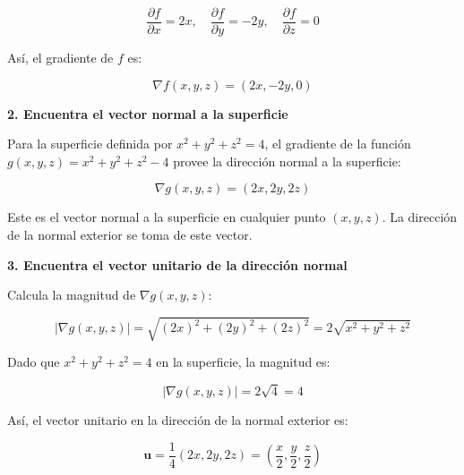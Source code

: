 \documentclass{report}
\begin{document}
                        \[
                        \frac{\partial f}{\partial x} = 2x, \quad \frac{\partial f}{\partial y} = -2y, \quad \frac{\partial f}{\partial z} = 0
                        \]
                        
                        Así, el gradiente de \( f \) es:
                        
                        \[
                        \nabla f(x, y, z) = (2x, -2y, 0)
                        \]
                        
                        \textbf{2. Encuentra el vector normal a la superficie}
                        
                        Para la superficie definida por \( x^2 + y^2 + z^2 = 4 \), el gradiente de la función \( g(x, y, z) = x^2 + y^2 + z^2 - 4 \) provee la dirección normal a la superficie:
                        
                        \[
                        \nabla g(x, y, z) = (2x, 2y, 2z)
                        \]
                        
                        Este es el vector normal a la superficie en cualquier punto \((x, y, z)\). La dirección de la normal exterior se toma de este vector.
                        
                        \textbf{3. Encuentra el vector unitario de la dirección normal}
                        
                        Calcula la magnitud de \( \nabla g(x, y, z) \):
                        
                        \[
                        |\nabla g(x, y, z)| = \sqrt{(2x)^2 + (2y)^2 + (2z)^2} = 2\sqrt{x^2 + y^2 + z^2}
                        \]
                        
                        Dado que \( x^2 + y^2 + z^2 = 4 \) en la superficie, la magnitud es:
                        
                        \[
                        |\nabla g(x, y, z)| = 2\sqrt{4} = 4
                        \]
                        
                        Así, el vector unitario en la dirección de la normal exterior es:
                        
                        \[
                        \mathbf{u} = \frac{1}{4}(2x, 2y, 2z) = \left( \frac{x}{2}, \frac{y}{2}, \frac{z}{2} \right)
                        \]
                        
\end{document}
